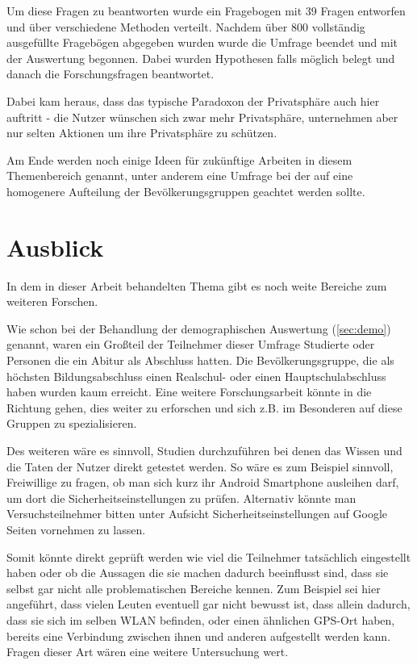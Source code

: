 Um diese Fragen zu beantworten wurde ein Fragebogen mit 39 Fragen entworfen und über verschiedene Methoden verteilt. Nachdem über 800 vollständig ausgefüllte Fragebögen abgegeben wurden wurde die Umfrage beendet und mit der Auswertung begonnen. Dabei wurden Hypothesen falls möglich belegt und danach die Forschungsfragen beantwortet. 

Dabei kam heraus, dass das typische Paradoxon der Privatsphäre auch hier auftritt - die Nutzer wünschen sich zwar mehr Privatsphäre, unternehmen aber nur selten Aktionen um ihre Privatsphäre zu schützen.

Am Ende werden noch einige Ideen für zukünftige Arbeiten in diesem Themenbereich genannt, unter anderem eine Umfrage bei der auf eine homogenere Aufteilung der Bevölkerungsgruppen geachtet werden sollte.

\section{Ausblick}
In dem in dieser Arbeit behandelten Thema gibt es noch weite Bereiche zum weiteren Forschen.

Wie schon bei der Behandlung der demographischen Auswertung (\ref{sec:demo}) genannt, waren ein Großteil der Teilnehmer dieser Umfrage Studierte oder Personen die ein Abitur als Abschluss hatten. Die Bevölkerungsgruppe, die als höchsten Bildungsabschluss einen Realschul- oder einen Hauptschulabschluss haben wurden kaum erreicht. Eine weitere Forschungsarbeit könnte in die Richtung gehen, dies weiter zu erforschen und sich z.B. im Besonderen auf diese Gruppen zu spezialisieren.

Des weiteren wäre es sinnvoll, Studien durchzuführen bei denen das Wissen und die Taten der Nutzer direkt getestet werden. So wäre es zum Beispiel sinnvoll, Freiwillige zu fragen, ob man sich kurz ihr Android Smartphone ausleihen darf, um dort die Sicherheitseinstellungen zu prüfen. Alternativ könnte man Versuchsteilnehmer bitten unter Aufsicht Sicherheitseinstellungen auf Google Seiten vornehmen zu lassen.

Somit könnte direkt geprüft werden wie viel die Teilnehmer tatsächlich eingestellt haben oder ob die Aussagen die sie machen dadurch beeinflusst sind, dass sie selbst gar nicht alle problematischen Bereiche kennen. Zum Beispiel sei hier angeführt, dass vielen Leuten eventuell gar nicht bewusst ist, dass allein dadurch, dass sie sich im selben WLAN befinden, oder einen ähnlichen GPS-Ort haben, bereits eine Verbindung zwischen ihnen und anderen aufgestellt werden kann. Fragen dieser Art wären eine weitere Untersuchung wert.


